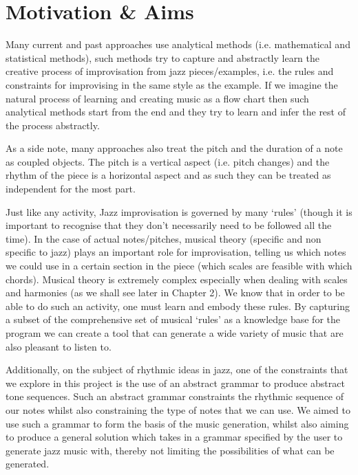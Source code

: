 \documentclass[pdftex,12pt,a4paper]{report}
\begin{document}
\section{Motivation \& Aims}
Many current and past approaches use analytical methods (i.e. mathematical and statistical methods), such methods try to capture and abstractly learn the creative process of improvisation from jazz pieces/examples, i.e. the rules and constraints for improvising in the same style as the example. If we imagine the natural process of learning and creating music as a flow chart then such analytical methods start from the end and they try to learn and infer the rest of the process abstractly. 

As a side note, many approaches also treat the pitch and the duration of a note as coupled objects. The pitch is a vertical aspect (i.e. pitch changes) and the rhythm of the piece is a horizontal aspect and as such they can be treated as independent for the most part.

Just like any activity, Jazz improvisation is governed by many `rules' (though it is important to recognise that they don't necessarily need to be followed all the time). In the case of actual notes/pitches, musical theory (specific and non specific to jazz) plays an important role for improvisation, telling us which notes we could use in a certain section in the piece (which scales are feasible with which chords). Musical theory is extremely complex especially when dealing with scales and harmonies (as we shall see later in Chapter 2). We know that in order to be able to do such an activity, one must learn and embody these rules. By capturing a subset of the comprehensive set of musical `rules' as a knowledge base for the program we can create a tool that can generate a wide variety of music that are also pleasant to listen to.

Additionally, on the subject of rhythmic ideas in jazz, one of the constraints that we explore in this project is the use of an abstract grammar to produce abstract tone sequences. Such an abstract grammar constraints the rhythmic sequence of our notes whilst also constraining the type of notes that we can use. We aimed to use such a grammar to form the basis of the music generation, whilst also aiming to produce a general solution which takes in a grammar specified by the user to generate jazz music with, thereby not limiting the possibilities of what can be generated.
\end{document}
